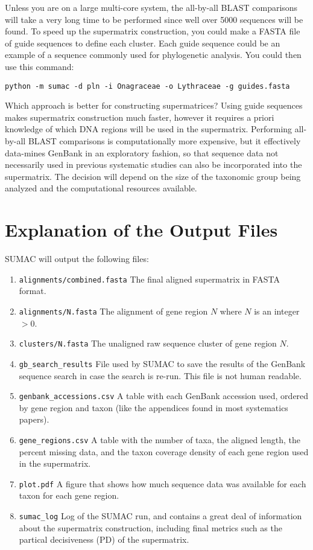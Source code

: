 \documentclass[10pt]{report}
\begin{document}
Unless you are on a large multi-core system, the all-by-all BLAST comparisons
will take a very long time to be performed since well over 5000 sequences
will be found.
To speed up the supermatrix construction, you could make a FASTA file
of guide sequences to define each cluster. Each guide
sequence could be an example of a sequence commonly used for phylogenetic
analysis. 
You could then use this command:

\begin{verbatim}
python -m sumac -d pln -i Onagraceae -o Lythraceae -g guides.fasta
\end{verbatim}

Which approach is better for constructing supermatrices?
Using guide sequences makes supermatrix construction much faster, however
it requires a priori knowledge of which DNA regions will be used
in the supermatrix.
Performing all-by-all BLAST comparisons is computationally
more expensive, but it effectively data-mines GenBank in an exploratory
fashion, so that sequence data not necessarily used in previous systematic
studies can also be incorporated into the supermatrix.
The decision will depend on the size of the taxonomic group being
analyzed and the computational resources available.

\section{Explanation of the Output Files}

SUMAC will output the following files:

\begin{enumerate}
\item \texttt{alignments/combined.fasta} The final aligned supermatrix in FASTA format.
\item \texttt{alignments/N.fasta} The alignment of gene region $N$ where $N$ is an integer $> 0$.
\item \texttt{clusters/N.fasta} The unaligned raw sequence cluster of gene region $N$.
\item \texttt{gb\_search\_results} File used by SUMAC to save the results of the GenBank sequence search in case the search is re-run. This file is not human readable.
\item \texttt{genbank\_accessions.csv} A table with each GenBank accession used, ordered by gene region and taxon (like the appendices found in most systematics papers).
\item \texttt{gene\_regions.csv} A table with the number of taxa, the aligned length, the percent missing data, and the taxon coverage density of each gene region used in the supermatrix.
\item \texttt{plot.pdf} A figure that shows how much sequence data was available for each taxon for each gene region.
\item \texttt{sumac\_log} Log of the SUMAC run, and contains a great deal of information about the supermatrix construction, including final metrics such as the partical decisiveness (PD) of the supermatrix.
\end{enumerate}
\end{document}
